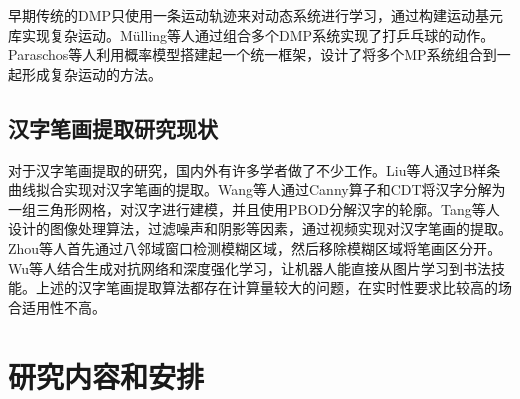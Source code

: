 早期传统的DMP只使用一条运动轨迹来对动态系统进行学习，通过构建运动基元库实现复杂运动。Mülling等人通过组合多个DMP系统实现了打乒乓球的动作\cite{Mulling2013}。Paraschos等人利用概率模型搭建起一个统一框架，设计了将多个MP系统组合到一起形成复杂运动的方法\cite{Paraschos2017}\cite{Paraschos2018}。

\subsection{汉字笔画提取研究现状}
对于汉字笔画提取的研究，国内外有许多学者做了不少工作。Liu等人通过B样条曲线拟合实现对汉字笔画的提取\cite{Liu2007a}。Wang等人通过Canny算子和CDT将汉字分解为一组三角形网格，对汉字进行建模，并且使用PBOD分解汉字的轮廓\cite{Wang2013}。Tang等人设计的图像处理算法，过滤噪声和阴影等因素，通过视频实现对汉字笔画的提取\cite{Tang2005}。Zhou等人首先通过八邻域窗口检测模糊区域，然后移除模糊区域将笔画区分开\cite{Zhou2017}。Wu等人结合生成对抗网络和深度强化学习，让机器人能直接从图片学习到书法技能\cite{Wu2020}。上述的汉字笔画提取算法都存在计算量较大的问题，在实时性要求比较高的场合适用性不高。

\section{研究内容和安排}


